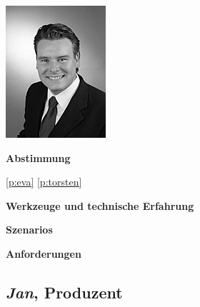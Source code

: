 \begin{multicols}{2}

\begin{center}
\includegraphics[width=0.5\columnwidth]{media/markus.jpg}
\end{center}


\textbf{Abstimmung}

\ref{p:eva}
\ref{p:torsten}

\textbf{Werkzeuge und technische Erfahrung}

\columnbreak

\textbf{Szenarios}

\textbf{Anforderungen}

\end{multicols}

\pagebreak

\subsection{\emph{Jan}, Produzent}\label{p:jan}

